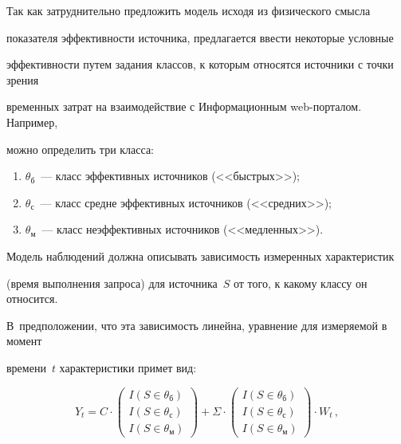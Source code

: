       


      Так как затруднительно предложить модель исходя из физического смысла 


показателя эффективности источника, предлагается ввести некоторые условные 


эффективности путем задания классов, к которым относятся источники с точки зрения 


временных затрат на взаимодействие с Информационным web-порталом. Например, 


можно определить три класса:


      \begin{enumerate}[(1)]


      \item  $\theta_{\mathrm{б}}$~--- класс эффективных источников (<<быстрых>>);


\item $\theta_{\mathrm{с}}$~--- класс средне эффективных источников (<<средних>>);


\item  $\theta_{\mathrm{м}}$~--- класс неэффективных источников (<<медленных>>).


\end{enumerate}





      Модель наблюдений должна описывать зависимость измеренных характеристик 


(время выполнения запроса) для источника~$S$ от того, к какому классу он относится. 


В~предположении, что эта зависимость линейна, уравнение для измеряемой в момент 


времени~$t$ характеристики примет вид:


      \begin{equation}


      Y_t=C\cdot


      \begin{pmatrix}


      I(S\in \theta_{\mathrm{б}})\\


      I(S\in \theta_{\mathrm{с}})\\


      I(S\in \theta_{\mathrm{м}})


      \end{pmatrix}+\Sigma\cdot


      \begin{pmatrix}


      I(S\in \theta_{\mathrm{б}})\\


      I(S\in \theta_{\mathrm{с}})\\


      I(S\in \theta_{\mathrm{м}})


      \end{pmatrix}\cdot W_t\,,


      \label{e1-8}


      \end{equation}


